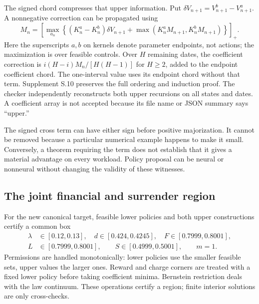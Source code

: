 The signed chord compresses that upper information. Put $\delta V_{n+1}=V^b_{n+1}-V^a_{n+1}$. A nonnegative correction can be propagated using
\begin{equation}
 M_n=\left[\max_{a_n}\left\{(K_n^a-K_n^b)\delta V_{n+1}
        +\max(K_n^aM_{n+1},K_n^bM_{n+1})\right\}\right]_+.
 \label{eq:r12_correction}
\end{equation}
Here the superscripts $a,b$ on kernels denote parameter endpoints, not actions; the maximization is over feasible controls. Over $H$ remaining dates, the coefficient correction is $i(H-i)M_n/[H(H-1)]$ for $H\geq2$, added to the endpoint coefficient chord. The one-interval value uses its endpoint chord without that term. Supplement S.10 preserves the full ordering and induction proof. The checker independently reconstructs both upper recursions on all states and dates. A coefficient array is not accepted because its file name or JSON summary says ``upper.''

The signed cross term can have either sign before positive majorization. It cannot be removed because a particular numerical example happens to make it small. Conversely, a theorem requiring the term does not establish that it gives a material advantage on every workload. Policy proposal can be neural or nonneural without changing the validity of these witnesses.

\subsection{The joint financial and surrender region}
For the new canonical target, feasible lower policies and both upper constructions certify a common box
\begin{equation}
\begin{split}
\lambda&\in[0.12,0.13],\quad d\in[0.424,0.4245],\quad F\in[0.7999,0.8001],\\
L&\in[0.7999,0.8001],\qquad S\in[0.4999,0.5001],\qquad m=1.
\end{split}
\label{eq:r12_jointbox}
\end{equation}
Permissions are handled monotonically: lower policies use the smaller feasible sets, upper values the larger ones. Reward and charge corners are treated with a fixed lower policy before taking coefficient minima. Bernstein restriction deals with the law continuum. These operations certify a region; finite interior solutions are only cross-checks.



